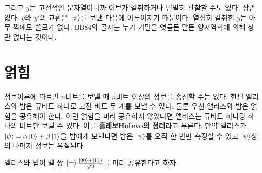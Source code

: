 \documentclass[a4paper,chapter,atbegshi]{oblivoir}
\begin{document}
그리고 $y$는 고전적인 문자열이니까 이브가 갈취하거나 면밀히 관찰할 수도 있다.
상관 없다. $y$와 $y'$의 교환은 $\ket{\psi}$를 보낸 다음에 이루어지기
때문이다. 열심히 갈취한 $y$는 아무 짝에도 쓸모가 없다. BB84의 골자는
누가 기밀을 엿듣든 말든 양자역학에 의해 상관 없다는 것이다.
\chapter{얽힘}
정보이론에 따르면 $n$비트를 보낼 때 $n$비트 이상의 정보를 송신할 수는
없다. 한편 앨리스와 밥은 큐비트 하나로 고전 비트 두 개를 보낼 수 있다.
물론 우선 앨리스와 밥은 얽힘을 공유해야 한다. 이런 얽힘을 미리
공유하지 않았다면 앨리스는 큐비트 하나당 하나의 비트만 보낼 수 있다. 이를
\textbf{홀레보{\tiny Holevo}의 정리}라고 부른다. 만약 앨리스가 $\ket{\psi}=
\alpha\ket0+\beta\ket1$을 밥에게 보낸다면 밥은 $\ket{\psi}$를 오직 한 번만
측정할 수 있고 $\ket{\psi}$상의 나머지 정보는 유실된다.

앨리스와 밥이 벨 쌍 $\ket=\frac{\ket{00}+\ket{11}}{\sqrt2}$를 미리 공유한다고
하자. 
\end{document}
